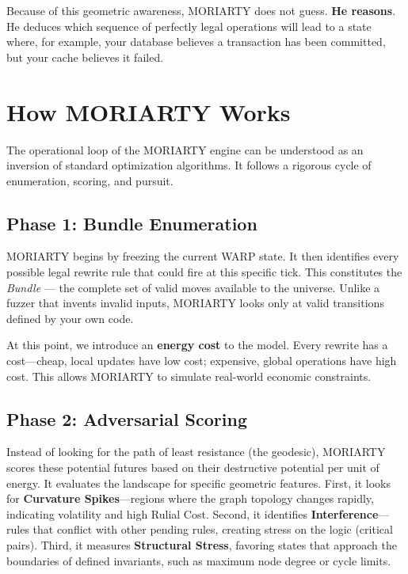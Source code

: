 Because of this geometric awareness, MORIARTY does not guess. \textbf{He reasons}. He deduces which sequence of perfectly legal operations will lead to a state where, for example, your database believes a transaction has been committed, but your cache believes it failed.

\section{How MORIARTY Works}

The operational loop of the MORIARTY engine can be understood as an inversion of standard optimization algorithms. It follows a rigorous cycle of enumeration, scoring, and pursuit.

\subsection*{Phase 1: Bundle Enumeration}

MORIARTY begins by freezing the current WARP state. It then identifies every possible legal rewrite rule that could fire at this specific tick. This constitutes the \emph{Bundle} --- the complete set of valid moves available to the universe. Unlike a fuzzer that invents invalid inputs, MORIARTY looks only at valid transitions defined by your own code.

At this point, we introduce an \textbf{energy cost} to the model. Every rewrite has a cost—cheap, local updates have low cost; expensive, global operations have high cost. This allows MORIARTY to simulate real-world economic constraints.

\subsection*{Phase 2: Adversarial Scoring}

Instead of looking for the path of least resistance (the geodesic), MORIARTY scores these potential futures based on their destructive potential per unit of energy. It evaluates the landscape for specific geometric features. First, it looks for \textbf{Curvature Spikes}—regions where the graph topology changes rapidly, indicating volatility and high Rulial Cost. Second, it identifies \textbf{Interference}—rules that conflict with other pending rules, creating stress on the logic (critical pairs). Third, it measures \textbf{Structural Stress}, favoring states that approach the boundaries of defined invariants, such as maximum node degree or cycle limits.

